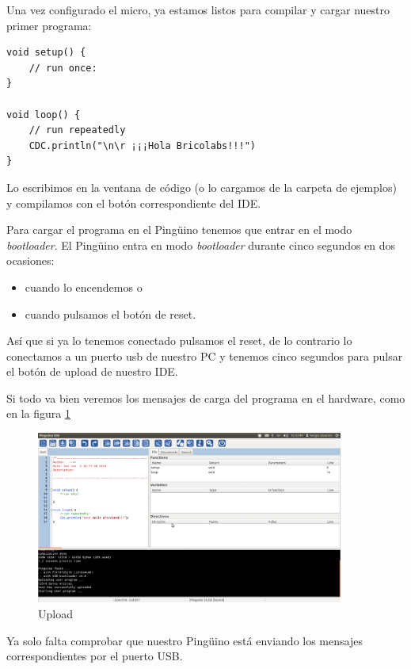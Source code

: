 \documentclass[12pt,a4paper,twoside,DIV=15]{scrartcl}
\begin{document}
Una vez configurado el micro, ya estamos listos para compilar y cargar
nuestro primer programa:

\begin{verbatim}
void setup() {
    // run once:
}

void loop() {
    // run repeatedly
    CDC.println("\n\r ¡¡¡Hola Bricolabs!!!")
}
\end{verbatim}

Lo escribimos en la ventana de código (o lo cargamos de la carpeta de
ejemplos) y compilamos con el botón correspondiente del IDE.

Para cargar el programa en el Pingüino tenemos que entrar en el modo
\emph{bootloader}. El Pingüino entra en modo \emph{bootloader} durante
cinco segundos en dos ocasiones:
\begin{itemize}
\item cuando lo encendemos o
\item cuando pulsamos el botón de reset.
\end{itemize}
  
Así que si ya lo tenemos conectado pulsamos el reset, de lo contrario
lo conectamos a un puerto usb de nuestro PC y tenemos cinco segundos
para pulsar el botón de upload de nuestro IDE.

Si todo va bien veremos los mensajes de carga del programa en el
hardware, como en la figura \ref{fig:upload}

\begin{figure}
  \centering
  \caption{Upload}
  \label{fig:upload}
  \includegraphics [width=0.9\textwidth]{Upload.png}
\end{figure}

Ya solo falta comprobar que nuestro Pingüino está enviando los
mensajes correspondientes por el puerto USB.
\end{document}
